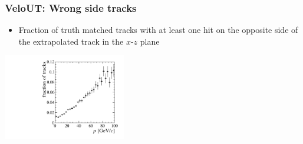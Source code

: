 \documentclass[aspectratio=1610]{beamer}
\begin{document}
\begin{frame}\frametitle{VeloUT: Wrong side tracks}

\begin{itemize}
  \item Fraction of truth matched tracks with at least one hit on the opposite side of the extrapolated \velo track in the $x$-$z$ plane
\end{itemize}

\begin{center}
\includegraphics[width=0.4\textwidth]{figs/upstream-tracking-upgrade/wrong_side_hits.pdf}
\end{center}
\end{frame}
\end{document}
